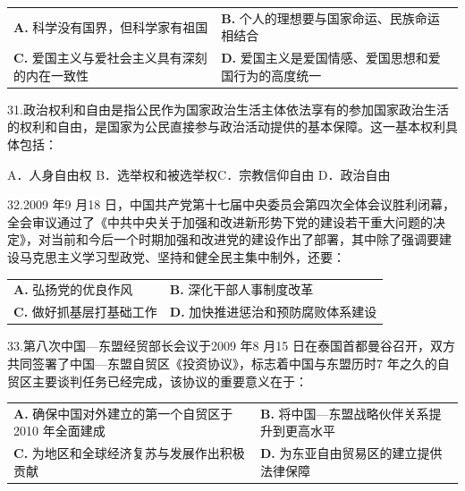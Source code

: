 \documentclass[UTF8,11pt]{ctexart}
\begin{document}
\begin{center}\begin{tabular}{>{\raggedright\arraybackslash}p{\dimexpr(\linewidth-4\tabcolsep)/2\relax}>{\raggedright\arraybackslash}p{\dimexpr(\linewidth-4\tabcolsep)/2\relax}}
\textbf{A.} 科学没有国界，但科学家有祖国 & \textbf{B.} 个人的理想要与国家命运、民族命运相结合\\[.35em]
\textbf{C.} 爱国主义与爱社会主义具有深刻的内在一致性 & \textbf{D.} 爱国主义是爱国情感、爱国思想和爱国行为的高度统一\\[.35em]\end{tabular}\end{center}

31.政治权利和自由是指公民作为国家政治生活主体依法享有的参加国家政治生活的权利和自由，是国家为公民直接参与政治活动提供的基本保障。这一基本权利具体包括：


A．人身自由权 B．选举权和被选举权C．宗教信仰自由 D．政治自由


32.2009 年9 月18 日，中国共产党第十七届中央委员会第四次全体会议胜利闭幕，全会审议通过了《中共中央关于加强和改进新形势下党的建设若干重大问题的决定》，对当前和今后一个时期加强和改进党的建设作出了部署，其中除了强调要建设马克思主义学习型政党、坚持和健全民主集中制外，还要：


\begin{center}\begin{tabular}{>{\raggedright\arraybackslash}p{\dimexpr(\linewidth-4\tabcolsep)/2\relax}>{\raggedright\arraybackslash}p{\dimexpr(\linewidth-4\tabcolsep)/2\relax}}
\textbf{A.} 弘扬党的优良作风 & \textbf{B.} 深化干部人事制度改革\\[.35em]
\textbf{C.} 做好抓基层打基础工作 & \textbf{D.} 加快推进惩治和预防腐败体系建设\\[.35em]\end{tabular}\end{center}

33.第八次中国—东盟经贸部长会议于2009 年8 月15 日在泰国首都曼谷召开，双方共同签署了中国—东盟自贸区《投资协议》，标志着中国与东盟历时7 年之久的自贸区主要谈判任务已经完成，该协议的重要意义在于：


\begin{center}\begin{tabular}{>{\raggedright\arraybackslash}p{\dimexpr(\linewidth-4\tabcolsep)/2\relax}>{\raggedright\arraybackslash}p{\dimexpr(\linewidth-4\tabcolsep)/2\relax}}
\textbf{A.} 确保中国对外建立的第一个自贸区于2010 年全面建成 & \textbf{B.} 将中国—东盟战略伙伴关系提升到更高水平\\[.35em]
\textbf{C.} 为地区和全球经济复苏与发展作出积极贡献 & \textbf{D.} 为东亚自由贸易区的建立提供法律保障\\[.35em]\end{tabular}\end{center}
\end{document}
